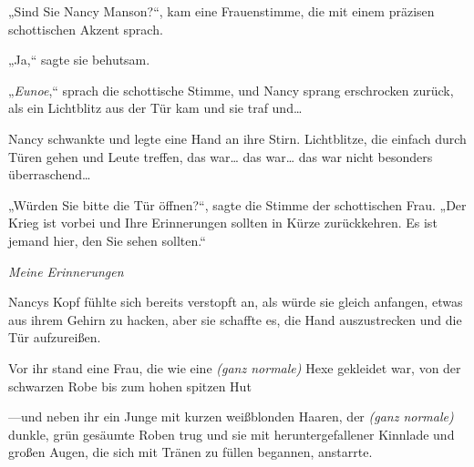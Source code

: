 „Sind Sie Nancy Manson?“, kam eine Frauenstimme, die mit einem präzisen schottischen Akzent sprach.

„Ja,“ sagte sie behutsam.

„\emph{Eunoe},“ sprach die schottische Stimme, und Nancy sprang erschrocken zurück, als ein Lichtblitz aus der Tür kam und sie traf und…

Nancy schwankte und legte eine Hand an ihre Stirn. Lichtblitze, die einfach durch Türen gehen und Leute treffen, das war… das war… das war nicht besonders überraschend…

„Würden Sie bitte die Tür öffnen?“, sagte die Stimme der schottischen Frau. „Der Krieg ist vorbei und Ihre Erinnerungen sollten in Kürze zurückkehren. Es ist jemand hier, den Sie sehen sollten.“

\emph{Meine Erinnerungen}

Nancys Kopf fühlte sich bereits verstopft an, als würde sie gleich anfangen, etwas aus ihrem Gehirn zu hacken, aber sie schaffte es, die Hand auszustrecken und die Tür aufzureißen.

Vor ihr stand eine Frau, die wie eine \emph{(ganz normale)} Hexe gekleidet war, von der schwarzen Robe bis zum hohen spitzen Hut

—und neben ihr ein Junge mit kurzen weißblonden Haaren, der \emph{(ganz normale)} dunkle, grün gesäumte Roben trug und sie mit heruntergefallener Kinnlade und großen Augen, die sich mit Tränen zu füllen begannen, anstarrte.

